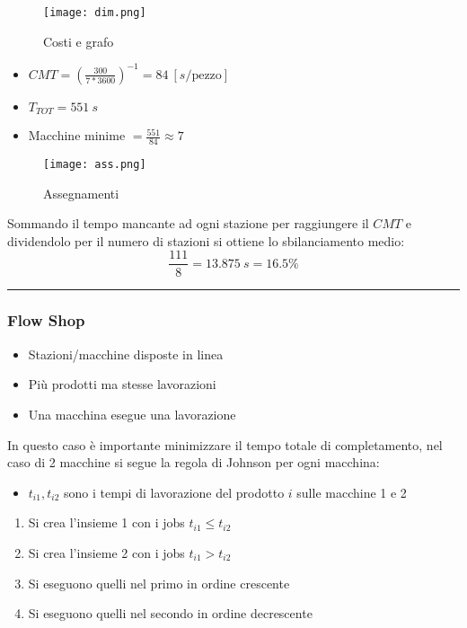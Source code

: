 \documentclass{article}
\begin{document}
\begin{figure}[ht]
    \centering
    \texttt{[image: dim.png]}
    \caption{Costi e grafo}
\end{figure}

\begin{itemize}
    \item $CMT=(\frac{300}{7*3600})^{-1}=84\ [s/\text{pezzo}]$
    \item $T_{TOT}=551\ s$
    \item Macchine minime $=\frac{551}{84}\approx 7$\newline
\end{itemize}

\begin{figure}[ht]
    \centering
    \texttt{[image: ass.png]}
    \caption{Assegnamenti}
\end{figure}

\noindent Sommando il tempo mancante ad ogni stazione per raggiungere il $CMT$ e dividendolo per il numero di stazioni si ottiene lo sbilanciamento medio:
$$\frac{111}{8}=13.875\ s=16.5\%$$

\noindent\rule{\textwidth}{0.5pt}

\newpage

\subsubsection{Flow Shop}

\begin{itemize}
    \item Stazioni/macchine disposte in linea
    \item Più prodotti ma stesse lavorazioni
    \item Una macchina esegue una lavorazione\newline
\end{itemize}

\noindent In questo caso è importante minimizzare il tempo totale di completamento, nel caso di 2 macchine si segue la regola di Johnson per ogni macchina:
\begin{itemize}
    \item $t_{i1},t_{i2}$ sono i tempi di lavorazione del prodotto $i$ sulle macchine 1 e 2
\end{itemize}
\begin{enumerate}
    \item Si crea l'insieme 1 con i jobs $t_{i1}\leq t_{i2}$
    \item Si crea l'insieme 2 con i jobs $t_{i1}>t_{i2}$
    \item Si eseguono quelli nel primo in ordine crescente
    \item Si eseguono quelli nel secondo in ordine decrescente
\end{enumerate}
\end{document}
